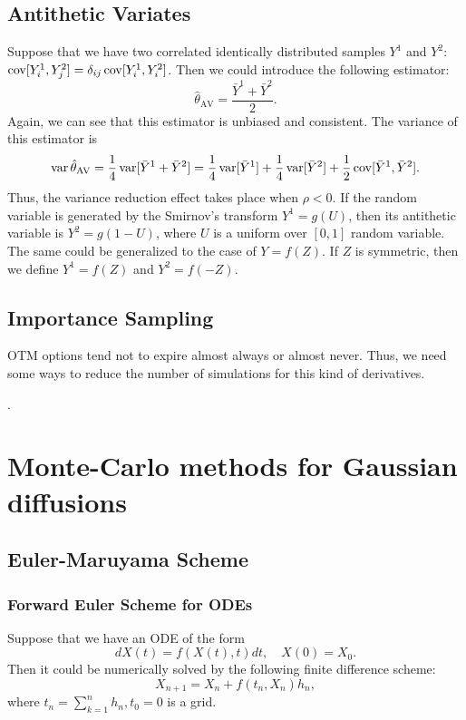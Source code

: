         \subsection{Antithetic Variates}
            Suppose that we have two correlated identically distributed samples $Y^1$ and $Y^2$: $\operatorname*{cov}[Y_i^1, Y_j^2] = \delta_{ij}\operatorname*{cov}[Y_i^1, Y_i^2]$.
            Then we could introduce the following estimator:
            \begin{equation}
                \hat\theta_{\operatorname{AV}} = \frac{\bar Y^1 + \bar Y^2}{2}.
            \end{equation}
            Again, we can see that this estimator is unbiased and consistent. The variance of this estimator is
            \begin{equation*}
                \operatorname*{var} \hat\theta_{\operatorname{AV}} = \frac{1}{4} \operatorname*{var}[\bar Y^1 + \bar Y^2] = \frac{1}{4} \operatorname*{var}[\bar Y^1] + \frac{1}{4} \operatorname*{var}[\bar Y^2] + \frac{1}{2} \operatorname*{cov}[\bar Y^1, \bar Y^2] .
            \end{equation*}
            Thus, the variance reduction effect takes place when $\rho < 0$.
            If the random variable is generated by the Smirnov's transform $Y^1 = g(U)$, then its antithetic 
            variable is $Y^2 = g(1-U)$, where $U$ is a uniform over $[0, 1]$ random variable. 
            The same could be generalized to the case of $Y = f(Z)$. If $Z$ is symmetric, then we define 
            $Y^1 = f(Z)$ and $Y^2 = f(-Z)$.

        \subsection{Importance Sampling}
        OTM options tend not to expire almost always or almost never. Thus, we need some ways to reduce the 
        number of simulations for this kind of derivatives.

        \cite{Zhao2013}.

    \section{Monte-Carlo methods for Gaussian diffusions}
    
        \subsection{Euler-Maruyama Scheme}
            \subsubsection{Forward Euler Scheme for ODEs}
                Suppose that we have an ODE of the form
                \begin{equation}
                    dX(t) = f(X(t), t)dt, \quad X(0) = X_0. \label{eq:ode1}
                \end{equation}
                Then it could be numerically solved by the following finite difference scheme:
                \begin{equation}
                    X_{n+1} = X_n + f(t_n, X_n)h_n, \label{Euler:ODE}
                \end{equation}
                where $t_n = \sum_{k=1}^n h_n, t_0 = 0$ is a grid. 

